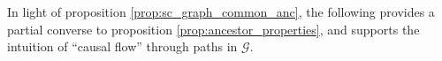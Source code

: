 \documentclass[12pt]{article}
\def\gcg{\mathcal{G}}  %
\newcommand{\anc}[1]{\mathcal{A}(#1)}  %
\begin{document}


In light of proposition \ref{prop:sc_graph_common_anc}, the following
provides a partial converse to proposition
\ref{prop:ancestor_properties}, and supports the intuition of ``causal
flow'' through paths in $\gcg$.
\end{document}
